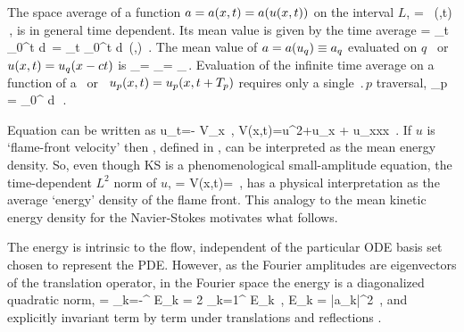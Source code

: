The {space average} of a function $a = a(x,t) = a(u(x,t))$  on
the interval $L$,
\beq
    \expct{\obser} = \Lint{\pSpace}\, \obser(\pSpace,t)
    \,,
    \label{rpo:spac_ave}
\eeq
is in general time dependent.
Its mean value is given by the {time average}
\beq
\timeAver{\obser}
    =
\lim_{t\rightarrow \infty}  \int_0^t \! d\tau \, \expct{\obser}
    =
\lim_{t\rightarrow \infty}  \int_0^t \!
    \Lint{\tau}  d\pSpace\, \obser(\pSpace,\tau)
    \,.
\label{rpo:tim_ave}
\eeq
The mean value of $a = a(u_q) \equiv a_q$ evaluated on $q$
\eqv\ or {\reqv} $u(x,t) = u_q(x-ct)$ is
\beq
\timeAver{\obser}_\stagn = \expct{\obser}_\stagn = \obser_\stagn\,.
\label{rpo:u-eqv} \eeq Evaluation of the infinite time average
 on a function of a \po\ or \rpo\
$u_p(x,t)=u_p(x,t+{T_{p}})$ requires only a single
$\period{p}$ traversal,
\beq
  \timeAver{\obser}_p = 
    \int_0^{\period{p}} \! d\tau \, \expct{\obser}
\,.
\label{rpo:u-cyc}
\eeq

Equation  can be written as
\beq
    u_t=- V_x
        \,,\qquad
    V(x,t)={\textstyle{}}u^2+u_{x} + u_{xxx}
    \,.
If $u$ is `flame-front velocity' then \expctE, defined in
, can be interpreted as the mean energy
density. So, even though KS is a phenomenological
small-amplitude equation, the time-dependent {$L^2$ norm
of $u$},
\beq
    \expctE=
  \Lint{\pSpace}
  V(x,t)=
  \Lint{\pSpace} 
  \,,
  \label{ksEnergy}
\eeq
has a physical interpretation as the average `energy'
density of the flame front. This analogy to the mean kinetic energy
density for the Navier-Stokes motivates what follows.

The energy  is intrinsic to the flow,
independent of the particular ODE basis set chosen to
represent the PDE. However, as the Fourier amplitudes are
eigenvectors of the translation operator, in the Fourier
space the energy is a diagonalized quadratic norm,
\beq
\expctE
          =  \sum_{k=-\infty}^{\infty} E_k
          = 2 \sum_{k=1}^{\infty} E_k
\,,\qquad
E_k =
    {\textstyle{}}|a_k|^2
\,,
and explicitly invariant term by term
under translations
and reflections .

